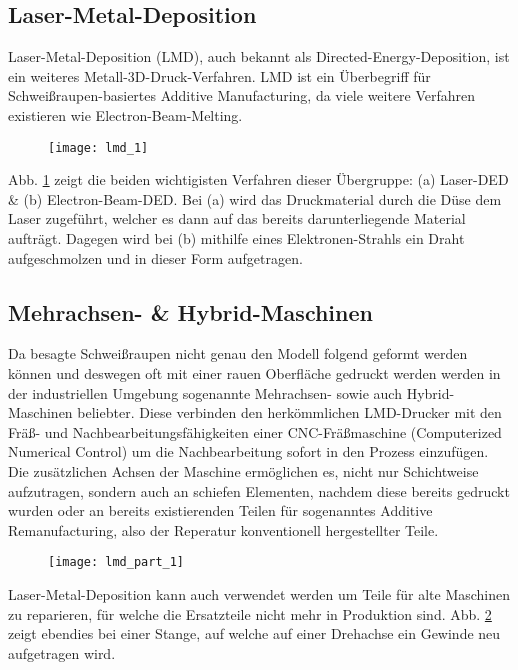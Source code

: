 \documentclass[main.tex]{subfiles}
\begin{document}
\subsection{Laser-Metal-Deposition}
Laser-Metal-Deposition (LMD), auch bekannt als Directed-Energy-Deposition, ist ein weiteres Metall-3D-Druck-Verfahren. LMD ist ein Überbegriff für Schweißraupen-basiertes Additive Manufacturing, da viele weitere Verfahren existieren wie Electron-Beam-Melting.
\begin{figure}[h!]
	\begin{center}

		\texttt{[image: lmd\_1]}
\label{img:lmd_1}	
	\end{center}
\end{figure}
Abb. \ref{img:lmd_1} zeigt die beiden wichtigisten Verfahren dieser Übergruppe: (a) Laser-DED \& (b) Electron-Beam-DED.
Bei (a) wird das Druckmaterial durch die Düse dem Laser zugeführt, welcher es dann auf das bereits darunterliegende Material aufträgt. 
Dagegen wird bei (b) mithilfe eines Elektronen-Strahls ein Draht aufgeschmolzen und in dieser Form aufgetragen. \parencite{ALL3D_1}
\subsection{Mehrachsen- \& Hybrid-Maschinen}

Da besagte Schweißraupen nicht genau den Modell folgend geformt werden können und deswegen oft mit einer rauen Oberfläche gedruckt werden werden in der industriellen Umgebung sogenannte Mehrachsen- sowie auch Hybrid-Maschinen beliebter. Diese verbinden den herkömmlichen LMD-Drucker mit den Fräß- und Nachbearbeitungsfähigkeiten einer CNC-Fräßmaschine (Computerized Numerical Control) um die Nachbearbeitung sofort in den Prozess einzufügen.
Die zusätzlichen Achsen der Maschine ermöglichen es, nicht nur Schichtweise aufzutragen, sondern auch an schiefen Elementen, nachdem diese bereits gedruckt wurden oder an bereits existierenden Teilen für sogenanntes Additive Remanufacturing, also der Reperatur konventionell hergestellter Teile. \parencite{ALL3D_2}
\begin{figure}[h!]
	\begin{center}
	\texttt{[image: lmd\_part\_1]}	
		\label{img:lmd_part_1}
	\end{center}
	
\end{figure}

Laser-Metal-Deposition kann auch verwendet werden um Teile für alte Maschinen zu reparieren, für welche die Ersatzteile nicht mehr in Produktion sind.
Abb. \ref{img:lmd_part_1} zeigt ebendies bei einer Stange, auf welche auf einer Drehachse ein Gewinde neu aufgetragen wird. 
\end{document}
